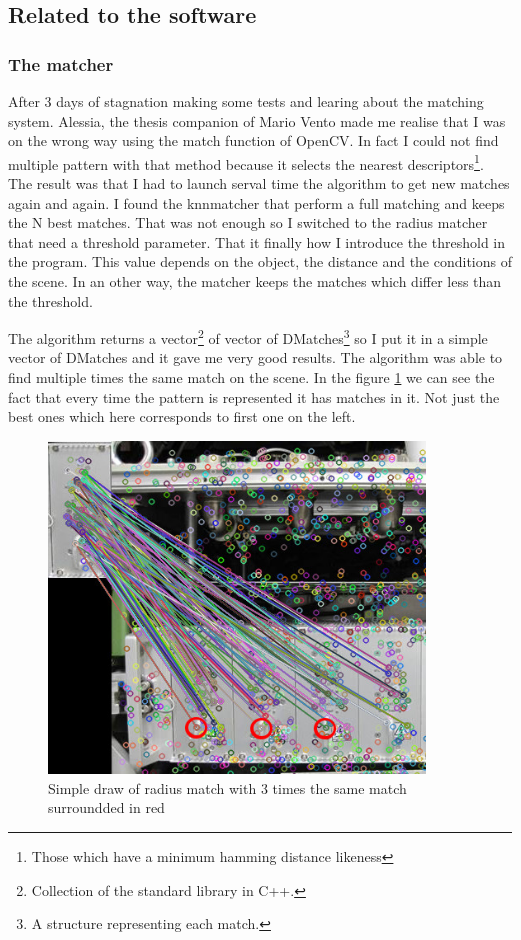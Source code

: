	\subsection{Related to the software}
	
	\subsubsection{The matcher}
	
	\par After 3 days of stagnation making some tests and learing about the matching system. Alessia, the thesis companion of Mario Vento made me realise that I was on the wrong way using the match function of OpenCV. In fact I could not find multiple pattern with that method because it selects the nearest descriptors\footnote{Those which have a minimum hamming distance likeness}. The result was that I had to launch serval time the algorithm to get new matches again and again. I found the knnmatcher that perform a full matching and keeps the N best matches. That was not enough so I switched to the radius matcher that need a threshold parameter. That it finally how I introduce the threshold in the program. This value depends on the object, the distance and the conditions of the scene. In an other way, the matcher keeps the matches which differ less than the threshold.
	\par The algorithm returns a vector\footnote{Collection of the standard library in C++.} of vector of DMatches\footnote{A structure representing each match.} so I put it in a simple vector of DMatches and it gave me very good results. The algorithm was able to find multiple times the same match on the scene. In the figure \ref{matches} we can see the fact that every time the pattern is represented it has matches in it. Not just the best ones which here corresponds to first one on the left.
	
	
	\begin{figure}[h]
		\begin{center}
			\includegraphics[width=10cm]{images_not_compressed/matches.jpg}
			\caption{Simple draw of radius match with 3 times the same match surroundded in red}
			\label{matches}	
		\end{center}
	\end{figure}
	
